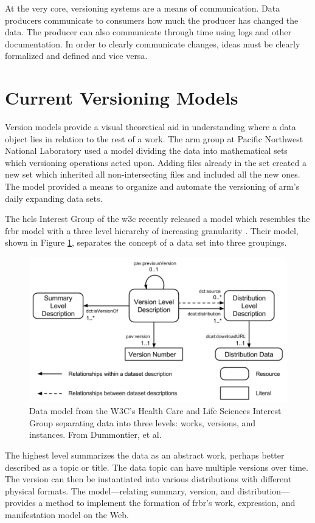 At the very core, versioning systems are a means of communication.
Data producers communicate to consumers how much the producer has changed the data.
The producer can also communicate through time using logs and other documentation.
In order to clearly communicate changes, ideas must be clearly formalized and defined and vice versa.

\section{Current Versioning Models} \label{sec:models}

Version models provide a visual theoretical aid in understanding where a data object lies in relation to the rest of a work.
The \gls{arm} group at Pacific Northwest National Laboratory used a model dividing the data into mathematical sets which versioning operations acted upon\cite{6906868}.
Adding files already in the set created a new set which inherited all non-intersecting files and included all the new ones.
The model provided a means to organize and automate the versioning of \gls{arm}'s daily expanding data sets.

The \gls{hcls} Interest Group of the \gls{w3c} recently released a model which resembles the \gls{frbr} model with a three level hierarchy of increasing granularity \cite{Dummontier2016}.
Their model, shown in Figure \ref{HCLSModel}, separates the concept of a data set into three groupings.
\begin{figure}%
	\centering
	\includegraphics[scale=0.34]{figures/HCLSModel.png}
	\caption[Data model from the W3C's Health Care and Life Sciences Interest Group separating data into three levels: works, versions, and instances.]{Data model from the W3C's Health Care and Life Sciences Interest Group separating data into three levels: works, versions, and instances.  From Dummontier, et al. \cite{Dummontier2016}}
	\label{HCLSModel}
\end{figure}
The highest level summarizes the data as an abstract work, perhaps better described as a topic or title.
The data topic can have multiple versions over time.
The version can then be instantiated into various distributions with different physical formats.
The model---relating summary, version, and distribution---provides a method to implement the formation of \gls{frbr}'s work, expression, and manifestation model on the Web.

